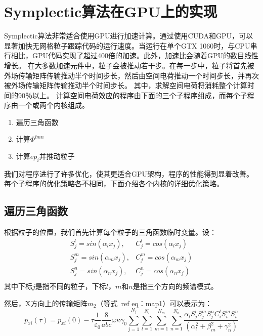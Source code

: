\section{Symplectic算法在GPU上的实现}     \label{section:symplectic_GPU}
Symplectic算法非常适合使用GPU进行加速计算。通过使用CUDA和GPU，可以显著加快无网格粒子跟踪代码的运行速度。当运行在单个GTX 1060时，与CPU串行相比，GPU代码实现了超过400倍的加速。此外，加速比会随着GPU的数目线性增长。
在大多数加速元件中，粒子会被推动若干步。在每一步中，粒子将首先被外场传输矩阵传输推动半个时间步长，然后由空间电荷推动一个时间步长，并再次被外场传输矩阵传输推动半个时间步长。
其中，求解空间电荷将消耗整个计算时间的90％以上。 计算空间电荷效应的程序由下面的三个子程序组成，而每个子程序由一个或两个内核组成。
\begin{enumerate}
  \item 遍历三角函数
  \item 计算$\Phi^{lmn}$
  \item 计算$ep_i$并推动粒子
\end{enumerate}

我们对程序进行了许多优化，使其更适合GPU架构，程序的性能得到显着改善。 每个子程序的优化策略各不相同，下面介绍各个内核的详细优化策略。
\subsection{遍历三角函数}
根据粒子的位置，我们首先计算每个粒子的三角函数临时变量。设：
\begin{equation}
\begin{array}{cc}
    S^{l}_j =sin(\alpha_l x_j), & C^{l}_j =cos(\alpha_l x_j)  \\
    S^{m}_j =sin(\alpha_m x_j), & C^{m}_j =cos(\alpha_m x_j)  \\
    S^{n}_j =sin(\alpha_n x_j), & C^{n}_j =cos(\alpha_n x_j)  \\
\end{array}
\end{equation}
其中下标$j$是指不同的粒子，下标$l$，$m$和$n$是指三个方向的频谱模式。

然后，X方向上的传输矩阵$ m_2 $（等式\ ref {eq：map1}）可以表示为：
\begin{equation}\label{eq:map2}
{{p}_{xi}}(\tau )={{p}_{xi}}(0)-\tau \frac{1}{{{\varepsilon }_{0}}}\frac{8}{abc}\omega \kappa {{\gamma }_{0}}\sum\limits_{j=1}^{{{N}_{j}}}{\sum\limits_{l=1}^{{{N}_{l}}}{\sum\limits_{m=1}^{{{N}_{m}}}{\sum\limits_{n=1}^{{{N}_{n}}}{\frac{{{\alpha }_{l}}S_{j}^{l}S_{j}^{m}S_{j}^{n}C_{i}^{l}S_{i}^{m}S_{i}^{n}}{(\alpha _{l}^{2}+\beta _{m}^{2}+\gamma _{n}^{2})}}}}}
\end{equation}

